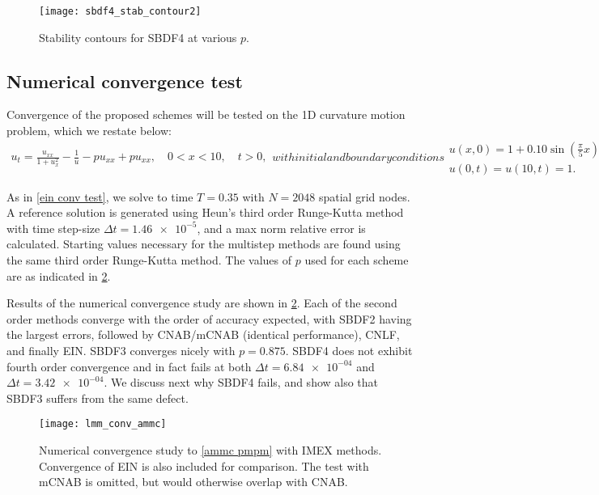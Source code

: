 \begin{figure}[htb!]
        \centering
\texttt{[image: sbdf4\_stab\_contour2]}
\caption{Stability contours for SBDF4 at various $p$.}
\label{sbdf4 contours}
\end{figure}

\subsection{Numerical convergence test}
Convergence of the proposed schemes will be tested on the 1D curvature motion problem, which we restate below:
\begin{subequations}
\begin{align}
        u_t = \frac{u_{xx}}{1 + u_x^2} - \frac{1}{u} - pu_{xx} + pu_{xx},
\quad 0< x< 10,\quad t>0,
\end{align}
with initial and boundary conditions
\begin{gather}
        u(x,0) = 1 + 0.10\sin\left(\frac{\pi}{5}x \right) 
\\
u(0,t) = u(10,t) = 1.
\end{gather}
\label{ammc pmpm}
\end{subequations}

As in \cref{ein conv test}, we solve to time $T=0.35$ with $N=2048$ spatial grid nodes. A reference solution is generated using Heun's third order Runge-Kutta method \cite{hundsdorfer2013numerical} with time step-size $\Delta t = \num{1.46e-5}$, and a max norm relative error is calculated. Starting values necessary for the multistep methods are found using the same third order Runge-Kutta method. The values of $p$ used for each scheme are as indicated in \cref{lmm conv test}.

Results of the numerical convergence study are shown in \cref{lmm conv test}. Each of the second order methods converge with the order of accuracy expected, with SBDF2 having the largest errors, followed by CNAB/mCNAB (identical performance), CNLF, and finally EIN. SBDF3 converges nicely with $p=0.875$. SBDF4 does not exhibit fourth order convergence and in fact fails at both $\Delta t =\num{6.84e-04}$ and $\Delta t=\num{3.42e-04}$. We discuss next why SBDF4 fails, and show also that SBDF3 suffers from the same defect.

\begin{figure}
        \centering
\texttt{[image: lmm\_conv\_ammc]}
\caption[Numerical convergence study with IMEX methods.]{Numerical convergence study to \cref{ammc pmpm} with IMEX methods. Convergence of EIN is also included for comparison. The test with mCNAB is omitted, but would otherwise overlap with CNAB.}
\label{lmm conv test}
\end{figure}

